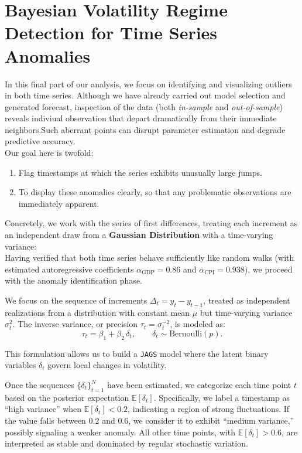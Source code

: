 \documentclass{Configuration_Files/PoliMi3i_thesis}
\begin{document}





\newpage
\chapter{Bayesian Volatility Regime Detection for Time Series Anomalies}
In this final part of our analysis, we focus on identifying and visualizing outliers in both time series. Although we have already carried out model selection and generated forecast, inspection of the data (both \textit{in-sample} and \textit{out-of-sample}) reveals indiviual observation that depart dramatically from their immediate neighbors.Such aberrant points can disrupt parameter estimation and degrade predictive accuracy.\\
Our goal here is twofold:
\begin{enumerate}
    \item Flag timestamps at which the series exhibits unusually large jumps.
    \item To display these anomalies clearly, so that any problematic observations are immediately apparent.
\end{enumerate}
Concretely, we work with the series of first differences, treating each increment as an independent draw from a \textbf{Gaussian Distribution} with a time-varying variance:\\
Having verified that both time series behave sufficiently like random walks (with estimated autoregressive coefficients \(\alpha_{\text{GDP}} = 0.86\) and \(\alpha_{\text{CPI}} = 0.938\)), we proceed with the anomaly identification phase.

We focus on the sequence of increments \(\Delta_t = y_t - y_{t-1}\), treated as independent realizations from a distribution with constant mean \(\mu\) but time-varying variance \(\sigma_t^2\). The inverse variance, or precision \(\tau_t = \sigma_t^{-2}\), is modeled as:
\[
\tau_t = \beta_1 + \beta_2\, \delta_t, \qquad \delta_t \sim \text{Bernoulli}(p).
\]

This formulation allows us to build a \texttt{JAGS} model where the latent binary variables \(\delta_t\) govern local changes in volatility.

Once the sequences \(\{\delta_t\}_{t=1}^N\) have been estimated, we categorize each time point \(t\) based on the posterior expectation \(\mathbb{E}[\delta_t]\). Specifically, we label a timestamp as ``high variance'' when \(\mathbb{E}[\delta_t] < 0.2\), indicating a region of strong fluctuations. If the value falls between \(0.2\) and \(0.6\), we consider it to exhibit ``medium variance,'' possibly signaling a weaker anomaly. All other time points, with \(\mathbb{E}[\delta_t] > 0.6\), are interpreted as stable and dominated by regular stochastic variation.\\
\end{document}
